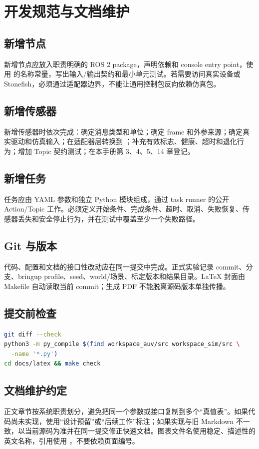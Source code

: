 \chapter{开发规范与文档维护}
\label{app:development}

\section{新增节点}
新增节点应放入职责明确的 ROS 2 package，声明依赖和 console entry point，使用  的名称常量，写出输入/输出契约和最小单元测试。若需要访问真实设备或 Stonefish，必须通过适配器边界，不能让通用控制包反向依赖仿真包。

\section{新增传感器}
新增传感器时依次完成：确定消息类型和单位；确定 frame 和外参来源；确定真实驱动和仿真输入；在适配器层转换到 ；补充有效标志、健康、超时和退化行为；增加 Topic 契约测试；在本手册第 3、4、5、14 章登记。

\section{新增任务}
任务应由 YAML 参数和独立 Python 模块组成，通过 task runner 的公开 Action/Topic 工作。必须定义开始条件、完成条件、超时、取消、失败恢复、传感器丢失和安全停止行为，并在测试中覆盖至少一个失败路径。

\section{Git 与版本}
代码、配置和文档的接口性改动应在同一提交中完成。正式实验记录 commit、分支、bringup profile、seed、world/场景、标定版本和结果目录。LaTeX 封面由 Makefile 自动读取当前 commit；生成 PDF 不能脱离源码版本单独传播。

\section{提交前检查}
\begin{lstlisting}[language=bash,caption={提交前最小检查集}]
git diff --check
python3 -m py_compile $(find workspace_auv/src workspace_sim/src \
  -name '*.py')
cd docs/latex && make check
\end{lstlisting}

\section{文档维护约定}
正文章节按系统职责划分，避免把同一个参数或接口复制到多个“真值表”。如果代码尚未实现，使用“设计预留”或“后续工作”标注；如果实现与旧 Markdown 不一致，以当前源码为准并在同一提交修正快速文档。图表文件名使用稳定、描述性的英文名称，引用使用 ，不要依赖页面编号。

